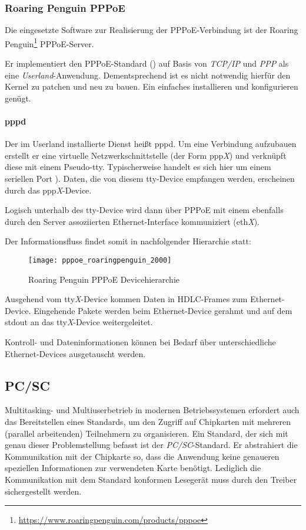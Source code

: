 \subsubsection{Roaring Penguin PPPoE}
Die eingesetzte Software zur Realisierung der PPPoE-Verbindung ist der
Roaring Penguin\footnote{\url{https://www.roaringpenguin.com/products/pppoe}} PPPoE-Server.

Er implementiert den PPPoE-Standard () auf Basis
von \textit{TCP/IP} und \textit{PPP} als eine \textit{Userland}-Anwendung.
Dementsprechend ist es nicht notwendig hierfür den Kernel zu patchen und neu zu bauen.
Ein einfaches installieren und konfigurieren genügt.

\paragraph{pppd}
Der im Userland installierte Dienst heißt pppd. Um eine Verbindung aufzubauen
erstellt er eine virtuelle Netzwerkschnittstelle (der Form ppp\textit{X}) und verknüpft diese
mit einem Pseudo-\ac{tty}. %
Typischerweise handelt es sich hier um einem seriellen Port \cite{roaringpenguinpres}).
Daten, die von diesem tty-Device empfangen werden, erscheinen durch das ppp\textit{X}-Device.

Logisch unterhalb des tty-Device wird dann über PPPoE mit einem ebenfalls durch den Server
assoziierten Ethernet-Interface kommuniziert (eth\textit{X}).

Der Informationsfluss findet somit in nachfolgender Hierarchie statt:
 \begin{figure}[htp]
  \begin{center}
   \texttt{[image: pppoe\_roaringpenguin\_2000]}
  \end{center}
  \caption[Roaring Penguin PPPoE Devicehierarchie]{Roaring Penguin PPPoE Devicehierarchie \cite{roaringpenguinpres}}
  \label{fig:pppoe_roaringpenguin_devicehierarchy}
 \end{figure}

Ausgehend vom tty\textit{X}-Device kommen Daten in \ac{HDLC}-Frames zum Ethernet-Device.
Eingehende Pakete werden beim Ethernet-Device gerahmt und auf dem stdout an
das tty\textit{X}-Device weitergeleitet.

Kontroll- und Dateninformationen können bei Bedarf über unterschiedliche
Ethernet-Devices ausgetauscht werden.

\subsection{PC/SC}
Multitasking- und Multiuserbetrieb in modernen Betriebssystemen erfordert
auch das Bereitstellen eines Standards, um den Zugriff auf Chipkarten
mit mehreren (parallel arbeitenden) Teilnehmern zu organisieren. Ein Standard, der sich mit genau
dieser Problemstellung befasst ist der \textit{\ac{PC/SC}}-Standard.
Er abstrahiert die Kommunikation mit der Chipkarte so,
dass die Anwendung keine genaueren speziellen Informationen zur verwendeten
Karte benötigt. Lediglich die Kommunikation mit dem Standard
konformen Lesegerät muss durch den Treiber sichergestellt werden.

